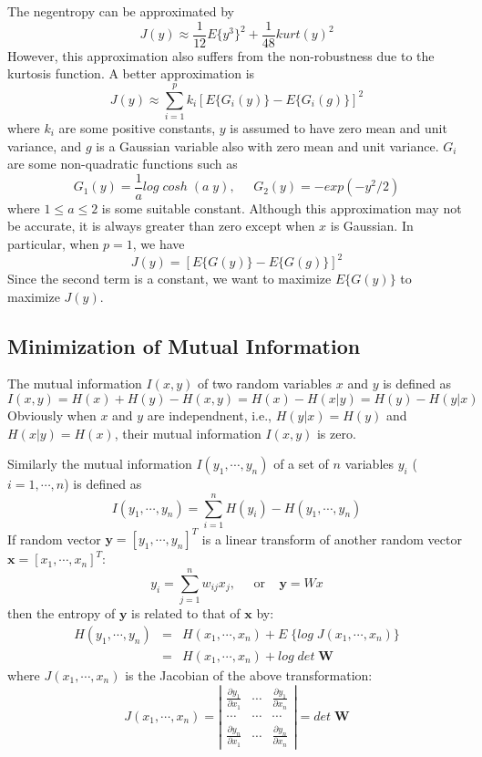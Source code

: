 \begin{itemize}
The negentropy can be approximated by
\[	J(y)\approx \frac{1}{12}E\{y^3\}^2+\frac{1}{48} kurt(y)^2	\]
However, this approximation also suffers from the non-robustness due to
the kurtosis function. A better approximation is
\[	J(y)\approx \sum_{i=1}^p k_i [ E\{G_i(y)\}-E\{G_i(g)\}]^2 	\]
where $k_i$ are some positive constants, $y$ is assumed to have zero mean
and unit variance, and $g$ is a Gaussian variable also with zero mean and
unit variance. $G_i$ are some non-quadratic functions such as
\[ G_1(y)=\frac{1}{a} log\;cosh\;(a \;y),\;\;\;\;\;G_2(y) =-exp(-y^2/2) \]
where $1 \le a \le 2$ is some suitable constant. Although this approximation
may not be accurate, it is always greater than zero except when $x$ is
Gaussian. In particular, when $p=1$, we have
\[	J(y)=[E\{ G(y)\}-E\{G(g)\}]^2 	\]
Since the second term is a constant, we want to maximize $E\{ G(y) \}$ to
maximize $J(y)$.


\end{itemize}

\subsection*{Minimization of Mutual Information}

The mutual information $I(x,y)$ of two random variables $x$ and $y$ is
defined as
\[	I(x,y)=H(x)+H(y)-H(x,y)=H(x)-H(x|y)=H(y)-H(y|x)		\]
Obviously when $x$ and $y$ are independnent, i.e., $H(y|x)=H(y)$ and
$H(x|y)=H(x)$, their mutual information $I(x,y)$ is zero.


Similarly the mutual information $I(y_1,\cdots,y_n)$ of a set of $n$
variables $y_i$ ($i=1,\cdots,n$) is defined as
\[	I(y_1,\cdots,y_n)=\sum_{i=1}^n H(y_i)-H(y_1,\cdots,y_n)	\]
If random vector ${\mathbf y}=[y_1,\cdots,y_n]^T$ is a linear transform of
another random vector ${\mathbf x}=[x_1,\cdots,x_n]^T$:
\[	y_i=\sum_{j=1}^n w_{ij} x_j,\;\;\;\;\;\mbox{or}\;\;\;\;{\mathbf y=Wx}	\]
then the entropy of ${\mathbf y}$ is related to that of ${\mathbf x}$ by:
\begin{eqnarray}
H(y_1,\cdots,y_n)&=&H(x_1,\cdots,x_n)+E\;\{ log\;J(x_1,\cdots,x_n)\}
	\nonumber \\
	&=& H(x_1,\cdots,x_n)+ log\;det\; {\mathbf W}
	\nonumber
\end{eqnarray}
where $J(x_1,\cdots,x_n)$ is the Jacobian of the above transformation:
\[	J(x_1,\cdots,x_n)=\left| \begin{array}{ccc}
\frac{\partial y_1}{\partial x_1} & \cdots &\frac{\partial y_1}{\partial x_n} \\
\cdots & \cdots & \cdots \\
\frac{\partial y_n}{\partial x_1} & \cdots &\frac{\partial y_n}{\partial x_n}
\end{array} \right|
=det\;{\mathbf W}	\]

